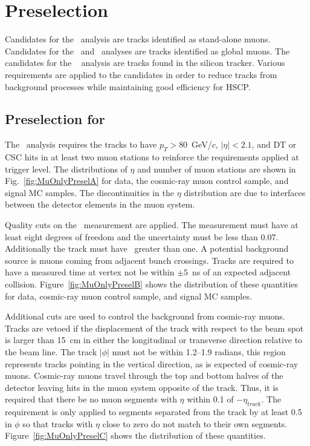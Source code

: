 \section{Preselection \label{sec:preselection}}
Candidates for the \muononly\ analysis are tracks identified as stand-alone muons. Candidates for the \tktof\ and \multi\ analyses are tracks identified
as global muons. The candidates for the \tkonly\
analysis are tracks found in the silicon tracker.
Various requirements are applied to the candidates in order to reduce tracks from background processes while maintaining good efficiency for HSCP.

\subsection{Preselection for \muononly\ \label{sec:muonlypreselection}}

The \muononly\ analysis requires the tracks to have $p_T > 80$~GeV/$c$, $|\eta| < 2.1$, and DT or CSC hits in at least two muon stations
to reinforce the requirements applied at trigger level. 
The distributions of $\eta$ and number of muon stations are shown in Fig.~\ref{fig:MuOnlyPreselA} for data, the cosmic-ray muon control sample, and signal MC samples.
The discontinuities in the $\eta$ distribution are due to interfaces between the detector elements in the muon system.

Quality cuts on the \invbeta\ measurement are applied. The measurement must have at least eight degrees of freedom and the uncertainty must be less than 0.07.
Additionally the track must have \invbeta\ greater than one.
A potential background source is muons coming from adjacent bunch crossings.
Tracks are required to have a measured time at vertex not be within $\pm5$~ns of an expected adjacent collision.
Figure~\ref{fig:MuOnlyPreselB} shows the distribution of these quantities for data, cosmic-ray muon control sample, and signal MC samples.

Additional cuts are used to control the background from cosmic-ray muons. Tracks are vetoed if the displacement of the track
with respect to the beam spot is larger than 15~cm in either the longitudinal or transverse direction relative to the beam line. 
The track $|\phi|$ must not be within 1.2--1.9 radians, this region represents tracks pointing in the vertical
direction, as is expected of cosmic-ray muons. Cosmic-ray muons travel 
through the top and bottom halves of the detector leaving hits in the muon system opposite of the track.
Thus, it is required that  there be no muon segments with $\eta$ within 0.1 of $-\eta_{track}$. The requirement is only applied to 
segments separated from the track by at least 0.5 in $\phi$ so that tracks with $\eta$ close to zero do not match to their own segments.
Figure~\ref{fig:MuOnlyPreselC} shows the distribution of these quantities.

